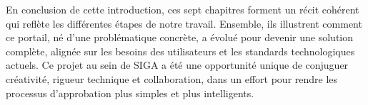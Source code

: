 En conclusion de cette introduction, ces sept chapitres forment un récit cohérent qui reflète les différentes étapes de notre travail. Ensemble, ils illustrent comment ce portail, né d’une problématique concrète, a évolué pour devenir une solution complète, alignée sur les besoins des utilisateurs et les standards technologiques actuels. Ce projet au sein de SIGA a été une opportunité unique de conjuguer créativité, rigueur technique et collaboration, dans un effort pour rendre les processus d’approbation plus simples et plus intelligents.